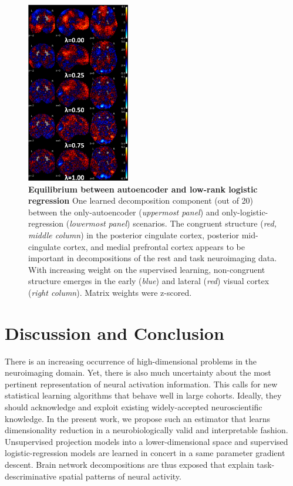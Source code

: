 \documentclass{article} %
\begin{document}
\begin{figure}
  \begin{center}
    \includegraphics[width=0.40\textwidth]{figures/figure3.png}
  \end{center}
  \caption {\textbf{
  Equilibrium between autoencoder and low-rank logistic regression}
  One learned decomposition component (out of 20) between the only-autoencoder
  (\textit{uppermost panel}) and only-logistic-regression
  (\textit{lowermost panel}) scenarios.
  The congruent structure (\textit{red, middle column})
  in the
  posterior cingulate cortex, posterior mid-cingulate cortex, and medial
  prefrontal cortex appears to be important in decompositions of the rest and
  task neuroimaging data. With increasing weight on the supervised learning,
  non-congruent structure emerges in the early (\textit{blue}) and
  lateral (\textit{red}) visual cortex
  (\textit{right column}). Matrix weights were z-scored.
  }
\end{figure}


\section{Discussion and Conclusion}
%
There is an increasing occurrence of high-dimensional problems in the
neuroimaging domain. Yet, there is also much uncertainty about the
most pertinent representation
of neural activation information.
This calls for new statistical learning algorithms that
behave well in large cohorts. Ideally, they should acknowledge
and exploit existing widely-accepted neuroscientific knowledge.
In the present work, we propose such an estimator that learns
dimensionality reduction
in a neurobiologically valid and interpretable fashion.
%
Unsupervised projection models into a lower-dimensional space and
supervised logistic-regression models are learned in concert
in a same parameter gradient descent.
Brain
network decompositions are thus exposed that explain task-descriminative spatial
patterns of neural activity.
\end{document}
